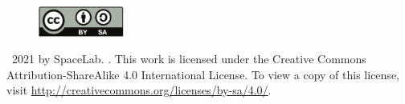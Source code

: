 \vfill

\begin{figure}[!h]
	\begin{center}
		\includegraphics[width=0.25\textwidth]{figures/by-sa.pdf}
	\end{center}
\end{figure}

\textcopyright\  2021 by SpaceLab. \thetitle. This work is licensed under the Creative Commons Attribution-ShareAlike 4.0 International License. To view a copy of this license, visit \href{http://creativecommons.org/licenses/by-sa/4.0/}{http://creativecommons.org/licenses/by-sa/4.0/}.
